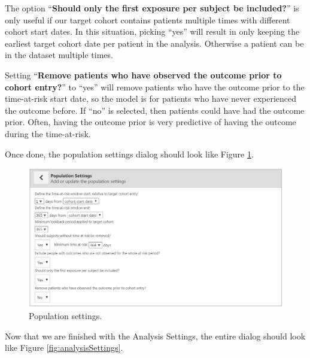 \documentclass[11pt]{book}
\theoremstyle{definition}
\theoremstyle{definition}
\theoremstyle{definition}
\theoremstyle{remark}
\begin{document}
The option ``\textbf{Should only the first exposure per subject be
included?}'' is only useful if our target cohort contains patients
multiple times with different cohort start dates. In this situation,
picking ``yes'' will result in only keeping the earliest target cohort
date per patient in the analysis. Otherwise a patient can be in the
dataset multiple times.

Setting ``\textbf{Remove patients who have observed the outcome prior to
cohort entry?}'' to ``yes'' will remove patients who have the outcome
prior to the time-at-risk start date, so the model is for patients who
have never experienced the outcome before. If ``no'' is selected, then
patients could have had the outcome prior. Often, having the outcome
prior is very predictive of having the outcome during the time-at-risk.

Once done, the population settings dialog should look like Figure
\ref{fig:populationSettings}.

\begin{figure}

{\centering \includegraphics[width=1\linewidth]{images/PatientLevelPrediction/populationSettings} 

}

\caption{Population settings.}\label{fig:populationSettings}
\end{figure}

Now that we are finished with the Analysis Settings, the entire dialog
should look like Figure \ref{fig:analysisSettings}.
\end{document}

